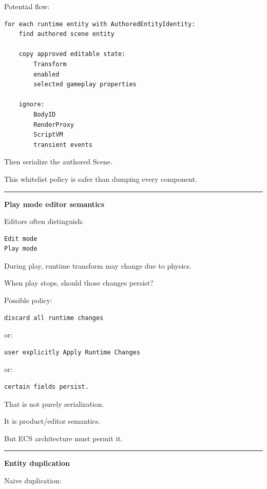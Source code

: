 Potential flow:

\begin{verbatim}
for each runtime entity with AuthoredEntityIdentity:
    find authored scene entity

    copy approved editable state:
        Transform
        enabled
        selected gameplay properties

    ignore:
        BodyID
        RenderProxy
        ScriptVM
        transient events
\end{verbatim}

Then serialize the authored Scene.

This whitelist policy is safer than dumping every component.

\begin{center}\rule{0.5\linewidth}{0.5pt}\end{center}

\textbf{Play mode editor semantics}

Editors often distinguish:

\begin{verbatim}
Edit mode
Play mode
\end{verbatim}

During play, runtime transform may change due to physics.

When play stops, should those changes persist?

Possible policy:

\begin{verbatim}
discard all runtime changes
\end{verbatim}

or:

\begin{verbatim}
user explicitly Apply Runtime Changes
\end{verbatim}

or:

\begin{verbatim}
certain fields persist.
\end{verbatim}

That is not purely serialization.

It is product/editor semantics.

But ECS architecture must permit it.

\begin{center}\rule{0.5\linewidth}{0.5pt}\end{center}

\textbf{Entity duplication}

Naive duplication:


